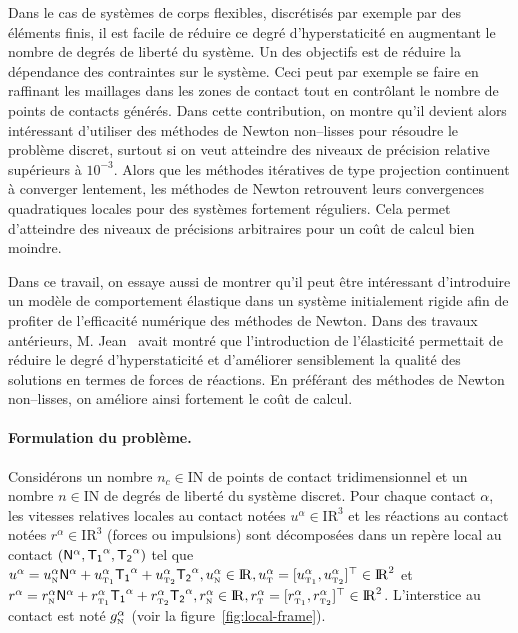 \documentclass{CSMA2017}
\def\RR{\nbR}
\def\NN{\nbN}
\def\nbR{\ensuremath{\mathrm{I\!R}}} %
\def\nbN{\ensuremath{\mathrm{I\!N}}} %
\def\n{{\hbox{\tiny{N}}}}
\def\t{{\hbox{\tiny{T}}}}
\def\tone{{\hbox{\tiny{T}}}_{\hbox{\tiny{1}}}}
\def\ttwo{{\hbox{\tiny{T}}}_{\hbox{\tiny{2}}}}
\newcommand\red[1]{\textcolor{red}{#1}}
\begin{document}
Dans le cas de systèmes de corps flexibles, discrétisés par exemple par des éléments finis, il est facile de réduire ce degré d'hyperstaticité en augmentant le nombre de degrés de liberté du système. Un des objectifs est de réduire la dépendance des contraintes sur le système. Ceci peut par exemple se faire en raffinant les maillages dans les zones de  contact tout en contrôlant le nombre de points de contacts générés.
%
Dans cette contribution, on montre qu'il devient alors intéressant d'utiliser des méthodes de Newton non--lisses pour résoudre le problème discret, surtout si on veut atteindre des niveaux de précision relative supérieurs à $10^{-3}$.  Alors que les méthodes itératives de type projection continuent à converger lentement, les méthodes de Newton retrouvent leurs convergences quadratiques locales pour des systèmes fortement réguliers. Cela permet d'atteindre des niveaux de précisions arbitraires pour un coût de calcul bien moindre.


Dans ce travail\marginpar{\red{voir si on peut le faire. supprimer le paragraphe sinon}}, on essaye aussi de montrer qu'il peut être intéressant d'introduire un modèle de comportement élastique dans un système initialement rigide afin de profiter de l'efficacité numérique des méthodes de Newton. Dans des travaux antérieurs, M. Jean~\cite{Jean1999,Acary.Jean98} avait montré que l'introduction de l'élasticité permettait de réduire le degré d'hyperstaticité et d'améliorer sensiblement la qualité des solutions en termes de forces de réactions. En préférant des méthodes de Newton non--lisses, on améliore ainsi fortement le coût de calcul.


\paragraph{Formulation du problème.}
Considérons un nombre  $n_c\in \NN$ de points de contact tridimensionnel et un nombre   $n\in\NN$ de degrés de liberté du système discret. Pour chaque contact $\alpha$, les vitesses relatives locales au contact notées  $u^\alpha\in\RR^3$ et les réactions au contact notées $r^\alpha\in\RR^3$ (forces ou impulsions) sont décomposées dans un repère local au contact $({\sf N}^\alpha,{\sf T_1}^\alpha,{\sf T_2}^\alpha)$ tel que  $u^\alpha = u^\alpha_{\n} {\sf N}^\alpha +   u^{\alpha}_{\tone}{\sf T_1}^\alpha + u^{\alpha}_{\ttwo}{\sf T_2}^\alpha , u^\alpha_{\n} \in \RR, u^\alpha_{\t} = [u^{\alpha}_{\tone},u^{\alpha}_{\ttwo}]^\top \in \RR^2$ et  $r^\alpha = r^\alpha_{\n} {\sf N}^\alpha +   r^{\alpha}_{\tone}{\sf T_1}^\alpha + r^{\alpha}_{\ttwo}{\sf T_2}^\alpha  , r^\alpha_{\n} \in \RR, r^\alpha_{\t}=[r^{\alpha}_{\tone},r^{\alpha}_{\ttwo}]^\top \in \RR^2$. L'interstice au contact est noté $g_\n^\alpha$ (voir la figure~\ref{fig:local-frame}).
\end{document}
